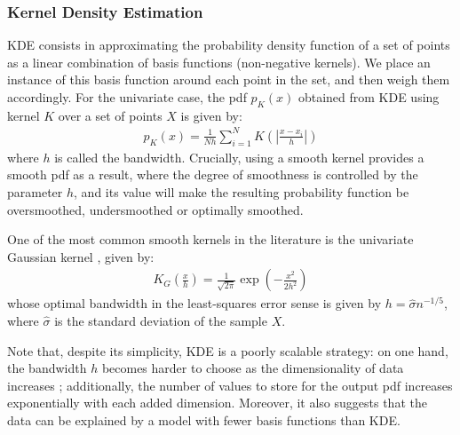 \documentclass[pdftex,11pt,a4paper]{article}
\theoremstyle{definition}
\theoremstyle{remark}
\begin{document}
\subsubsection{Kernel Density Estimation}
\par KDE consists in approximating the probability density function of a set of points as a linear combination of basis functions (non-negative kernels). We place an instance of this basis function around each point in the set, and then weigh them accordingly. For the univariate case, the pdf $p_K(x)$ obtained from KDE using kernel $K$ over a set of points $X$ is given by:
\begin{align*}
p_K(x) = \frac{1}{Nh}\sum_{i=1}^NK\left(\left|\frac{x - x_i}{h}\right|\right)
\end{align*}
where $h$ is called the bandwidth. Crucially, using a smooth kernel provides a smooth pdf as a result, where the degree of smoothness is controlled by the parameter $h$, and its value will make the resulting probability function be oversmoothed, undersmoothed or optimally smoothed.
\par One of the most common smooth kernels in the literature is the univariate Gaussian kernel \cite{hastie2008}, given by:
\begin{align*}
K_G\left(\frac{x}{h}\right) = \frac{1}{\sqrt{2\pi}}\exp{\left(-\frac{x^2}{2h^2}\right)}
\end{align*}
whose optimal bandwidth in the least-squares error sense is given by $h = \hat{\sigma}n^{-1/5}$, where $\hat{\sigma}$ is the standard deviation of the sample $X$.
\par Note that, despite its simplicity, KDE is a poorly scalable strategy: on one hand, the bandwidth $h$ becomes harder to choose as the dimensionality of data increases \cite{Hansen2009}; additionally, the number of values to store for the output pdf increases exponentially with each added dimension. Moreover, it also suggests that the data can be explained by a model with fewer basis functions than KDE.
\end{document}
